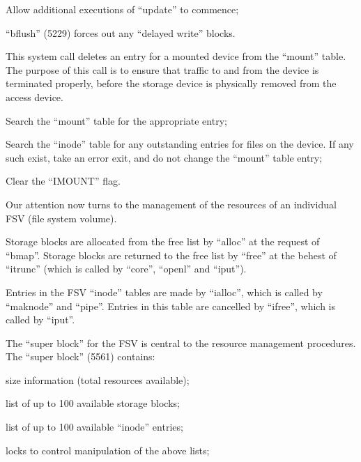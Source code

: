 \item[7229:] Allow  additional  executions  of
      ``update'' to commence;

\item[7230:] ``bflush'' (5229)  forces  out  any
      ``delayed write'' blocks.
\ed


This system call deletes an entry for a
mounted  device from the ``mount'' table.
The purpose of this call is  to  ensure
that  traffic to and from the device is
terminated properly, before the storage
device  is  physically removed from the
access device.

\bd
\item[6154:] Search the ``mount'' table for  the
      appropriate entry;

\item[6161:] Search the ``inode'' table for  any
      outstanding  entries for files on
      the device. If  any  such  exist,
      take  an  error  exit, and do not
      change the ``mount'' table entry;

\item[6168:] Clear the ``IMOUNT'' flag.
\ed



Our attention now turns to the  management  of the resources of an individual
FSV (file system volume).


Storage blocks are allocated  from  the
free  list by ``alloc'' at the request of
``bmap''.  Storage blocks are returned to
the  free  list by ``free'' at the behest
of ``itrunc'' (which is called by ``core'',
``openl'' and ``iput'').


Entries in the FSV ``inode''  tables  are
made  by  ``ialloc'',  which is called by
``maknode'' and ``pipe''. Entries  in  this
table  are  cancelled by ``ifree'', which
is called by ``iput''.


The ``super block'' for the FSV  is  central  to  the  resource management procedures.  The ``super block'' (5561) contains:

\bi
\item size  information (total resources available);

\item list of up to 100  available  storage blocks;

\item list of up to 100  available  ``inode'' entries;

\item locks to control manipulation of  the above lists;

